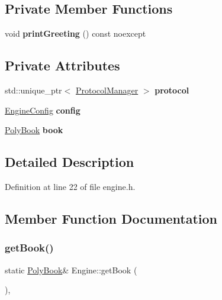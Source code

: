 \subsection*{Private Member Functions}
\begin{DoxyCompactItemize}
\item 
\mbox{\label{classEngine_a8402fb1995ca48ebb645b82bf943aac7}} 
void {\bfseries print\+Greeting} () const noexcept
\end{DoxyCompactItemize}
\subsection*{Private Attributes}
\begin{DoxyCompactItemize}
\item 
\mbox{\label{classEngine_a20ac20c3580244eced45e2f2f767a8da}} 
std\+::unique\+\_\+ptr$<$ \mbox{\hyperlink{classProtocolManager}{Protocol\+Manager}} $>$ {\bfseries protocol}
\item 
\mbox{\label{classEngine_a63db1301ca47ea013b3fa83fd541a9aa}} 
\mbox{\hyperlink{structEngineConfig}{Engine\+Config}} {\bfseries config}
\item 
\mbox{\label{classEngine_aa30f12ae58d51f051f22499f95c2602e}} 
\mbox{\hyperlink{classPolyBook}{Poly\+Book}} {\bfseries book}
\end{DoxyCompactItemize}


\subsection{Detailed Description}


Definition at line 22 of file engine.\+h.



\subsection{Member Function Documentation}
\mbox{\label{classEngine_a02d2a190f06bd06f23eb6ed02474f990}} 
\subsubsection{\texorpdfstring{get\+Book()}{getBook()}}
{\footnotesize\ttfamily static \mbox{\hyperlink{classPolyBook}{Poly\+Book}}\& Engine\+::get\+Book (\begin{DoxyParamCaption}{ }\end{DoxyParamCaption})\hspace{0.3cm}{\ttfamily [inline]}, {\ttfamily [static]}}



